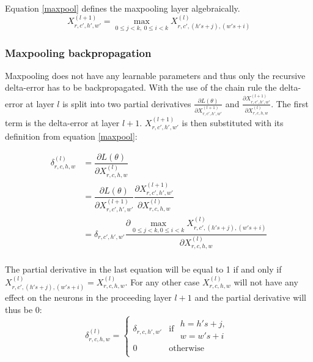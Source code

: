 \documentclass[a4paper,11pt,twoside]{article}
\newcommand*{\pd}[2]{\ensuremath{\dfrac{\partial #1}{\partial #2}}}
\newcommand*{\inpd}[2]{\ensuremath{\frac{\partial #1}{\partial #2}}}
\begin{document}
Equation \eqref{maxpool} defines the maxpooling layer algebraically. \cite{cs231n} \cite{convmath}
\begin{equation}\label{maxpool}
X^{(l+1)}_{r,c',h',w'} = \underset{0 \leq j < k, \ 0 \leq i < k}{\max} X^{(l)}_{r,c',(h's+j),(w's+i)}
\end{equation}

\subsubsection{Maxpooling backpropagation}
Maxpooling does not have any learnable parameters and thus only the recursive delta-error has to be backpropagated. With the use of the chain rule the delta-error at layer $l$ is split into two partial derivatives $\inpd{L(\theta)}{X^{(l+1)}_{r,c',h',w'}}$ and $\inpd{X^{(l+1)}_{r,c',h',w'}}{X^{(l)}_{r,c,h,w}}$. The first term is the delta-error at layer $l+1$. $X^{(l+1)}_{r,c',h',w'}$ is then substituted with its definition from equation \eqref{maxpool}: \cite{cs231n} \cite{convmath} \cite{webconv3}

\begin{equation}
\begin{split}
	\delta^{(l)}_{r,c,h,w}
		& = \pd{L(\theta)}{X^{(l)}_{r,c,h,w}} \\
		& = \pd{L(\theta)}{X^{(l+1)}_{r,c',h',w'}} \pd{X^{(l+1)}_{r,c',h',w'}}{X^{(l)}_{r,c,h,w}} \\
		& = \delta_{r,c',h',w'} \pd{\underset{0 \leq j < k,0 \leq i < k}{\max} X^{(l)}_{r,c',(h's+j),(w's+i)}}{X^{(l)}_{r,c,h,w}} \\
\end{split}
\end{equation}

The partial derivative in the last equation will be equal to 1 if and only if $X^{(l)}_{r,c',(h's+j),(w's+i)} = X^{(l)}_{r,c,h,w}$. For any other case $X^{(l)}_{r,c,h,w}$ will not have any effect on the neurons in the proceeding layer $l+1$ and the partial derivative will thus be 0:\cite{cs231n} \cite{convmath} \cite{webconv3}
\begin{equation}
\delta^{(l)}_{r,c,h,w} = \begin{cases}
				\delta_{r,c,h',w'} & \mbox{if } \begin{split} h = h's+j, \\w = w's+i \end{split}\\
				0 & \mbox{otherwise}\\
			\end{cases}
\end{equation}
\end{document}
